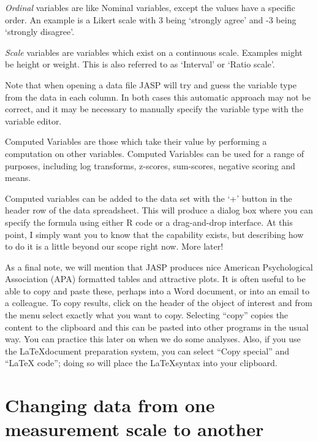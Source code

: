 {\it Ordinal} variables are like Nominal variables, except the values have a specific order. An example is a Likert scale with 3 being ‘strongly agree’ and -3 being ‘strongly disagree’.

{\it Scale} variables are variables which exist on a continuous scale. Examples might be height or weight. This is also referred to as ‘Interval’ or ‘Ratio scale’.

Note that when opening a data file JASP will try and guess the variable type from the data in each column. In both cases this automatic approach may not be correct, and it may be necessary to manually specify the variable type with the variable editor.


Computed Variables are those which take their value by performing a computation on other variables. Computed Variables can be used for a range of purposes, including log transforms, z-scores, sum-scores, negative scoring and means.

Computed variables can be added to the data set with the ‘+’ button in the header row of the data spreadsheet. This will produce a dialog box where you can specify the formula using either R code or a drag-and-drop interface. At this point, I simply want you to know that the capability exists, but describing how to do it is a little beyond our scope right now.  More later!


As a final note, we will mention that JASP produces nice American Psychological Association (APA) formatted tables and attractive plots. It is often useful to be able to copy and paste these, perhaps into a Word document, or into an email to a colleague. To copy results, click on the header of the object of interest and from the menu select exactly what you want to copy. Selecting ``copy'' copies the content to the clipboard and this can be pasted into other programs in the usual way. You can practice this later on when we do some analyses. Also, if you use the \LaTeX document preparation system, you can select ``Copy special'' and ``LaTeX code''; doing so will place the \LaTeX syntax into your clipboard.


\section{Changing data from one measurement scale to another\label{sec:coercion}}

